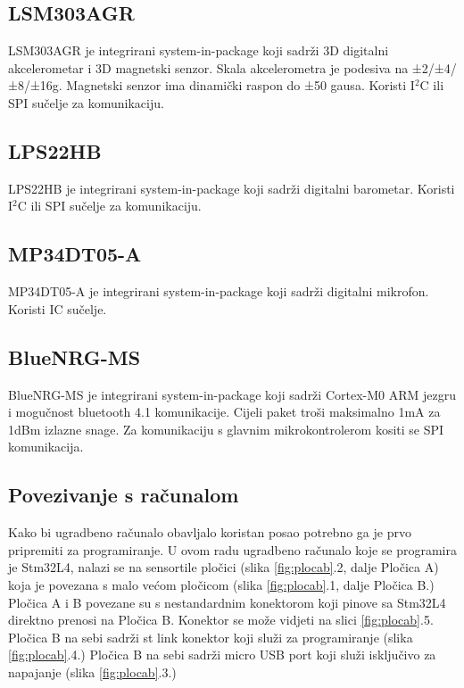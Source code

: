 \documentclass[times, utf8, diplomski]{diplomski}
\begin{document}
\subsection{LSM303AGR}
LSM303AGR je integrirani system-in-package koji sadrži 3D digitalni akcelerometar i 3D magnetski senzor. Skala akcelerometra je podesiva na
±2/±4/±8/±16g. Magnetski senzor ima dinamički raspon do ±50 gausa. Koristi I\(^2\)C ili SPI sučelje za komunikaciju.

\subsection{LPS22HB}
LPS22HB je integrirani system-in-package koji sadrži digitalni barometar. Koristi I\(^2\)C ili SPI sučelje za komunikaciju.

\subsection{MP34DT05-A}
MP34DT05-A je integrirani system-in-package koji sadrži digitalni mikrofon. Koristi IC sučelje.

\subsection{BlueNRG-MS}
BlueNRG-MS \cite{BlueNrgMs} je integrirani system-in-package koji sadrži Cortex-M0 ARM jezgru i mogučnost bluetooth 4.1 komunikacije.
Cijeli paket troši maksimalno 1mA za 1dBm izlazne snage. Za komunikaciju s glavnim mikrokontrolerom kositi se SPI komunikacija.

\subsection{Povezivanje s računalom}
Kako bi ugradbeno računalo obavljalo koristan posao potrebno ga je prvo pripremiti za programiranje. U ovom radu ugradbeno računalo koje se programira je Stm32L4, nalazi se na sensortile pločici (slika \ref{fig:plocab}.2, dalje Pločica A) koja je povezana s malo većom pločicom (slika \ref{fig:plocab}.1, dalje Pločica B.) Pločica A i B povezane su s nestandardnim konektorom koji pinove sa Stm32L4 direktno prenosi na Pločica B. Konektor se može vidjeti na slici \ref{fig:plocab}.5. Pločica B na sebi sadrži st link \cite{stlink} konektor koji služi za programiranje (slika \ref{fig:plocab}.4.) Pločica B na sebi sadrži micro USB port koji služi isključivo za napajanje (slika \ref{fig:plocab}.3.)
\end{document}
